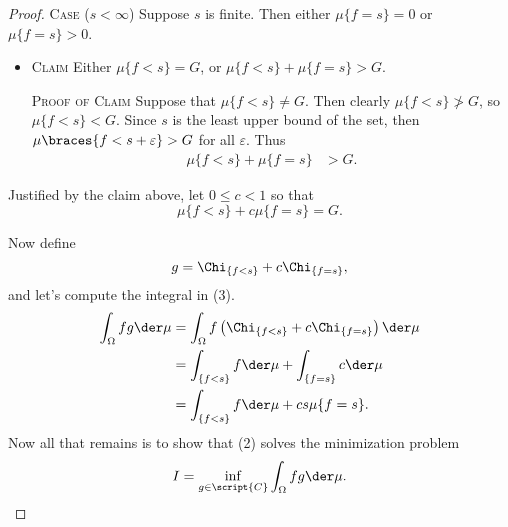 \documentclass[12pt,letterpaper]{article}
\renewcommand{\epsilon}{\varepsilon}
\begin{document}
\begin{enumerate}
\begin{proof}
	\textsc{Case} ($s<\infty$) Suppose $s$ is finite. Then either $\mu\{f=s\}=0$ or $\mu\{f=s\}>0$.
	\begin{itemize}
	\item[] 
	\textsc{Claim} Either $\mu\{f<s\}=G$, or $\mu\{f<s\}+\mu\{f=s\}>G$. 
	
	\textsc{Proof of Claim} Suppose that $\mu\{f<s\}\neq G$.
	Then clearly $\mu\{f<s\}\not> G$, so $\mu\{f<s\}< G$. Since $s$ is the least upper bound of the set, then $\mu\braces{f<s+\epsilon}>G$ for all $\epsilon$. Thus 
	\begin{align*}
	\mu\{f<s\}+\mu\{f=s\}&>G.
	\end{align*}
	\end{itemize}
	Justified by the claim above, let $0\leq c <1$ so that 
	\setcounter{equation}{4}
	\begin{equation}
	\mu\{f<s\} + c\mu\{f=s\} = G.
	\end{equation}
	
	Now define 	
	\setcounter{equation}{1}
	\begin{equation}
	g=\Chi_{\{f<s\}} + c\Chi_{\{f=s\}},
	\end{equation}
	and let's compute the integral in (3).
	\begin{align*}
	\int_\Omega fg\der\mu &= \int_\Omega f \left( \Chi_{\{f<s\}} + c\Chi_{\{f=s\}}\right) \der\mu \\
	&=\int_{\{f<s\}} f\der\mu + \int_{\{f=s\}} c\der\mu \\
	&=\int_{\{f<s\}} f\der\mu + cs\mu\{f=s\}.
	\end{align*}
	Now all that remains is to show that (2) solves the minimization problem
	\setcounter{equation}{0}
	\begin{equation}
	I=\inf_{g\in\script{C}} \int_\Omega fg\der\mu. 
	\end{equation}
	

\end{proof}
\end{enumerate}
\end{document}
